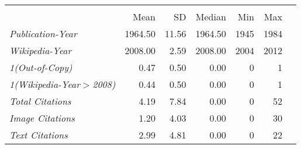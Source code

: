 {
\def\sym#1{\ifmmode^{#1}\else\(^{#1}\)\fi}
\begin{tabular*}{\hsize}{@{\hskip\tabcolsep\extracolsep\fill}l*{1}{rrrrrr}}
\toprule
                              &\multicolumn{5}{c}{}                                            \\
                              &        Mean&          SD&      Median&         Min&         Max\\
\midrule
\emph{Publication-Year}       &     1964.50&       11.56&     1964.50&        1945&        1984\\
\emph{Wikipedia-Year}         &     2008.00&        2.59&     2008.00&        2004&        2012\\
\emph{1(Out-of-Copy)}         &        0.47&        0.50&        0.00&           0&           1\\
\emph{1(Wikipedia-Year$>$2008)}&        0.44&        0.50&        0.00&           0&           1\\
\emph{Total Citations}        &        4.19&        7.84&        0.00&           0&          52\\
\emph{Image Citations}        &        1.20&        4.03&        0.00&           0&          30\\
\emph{Text Citations}         &        2.99&        4.81&        0.00&           0&          22\\
\bottomrule
\end{tabular*}
}
